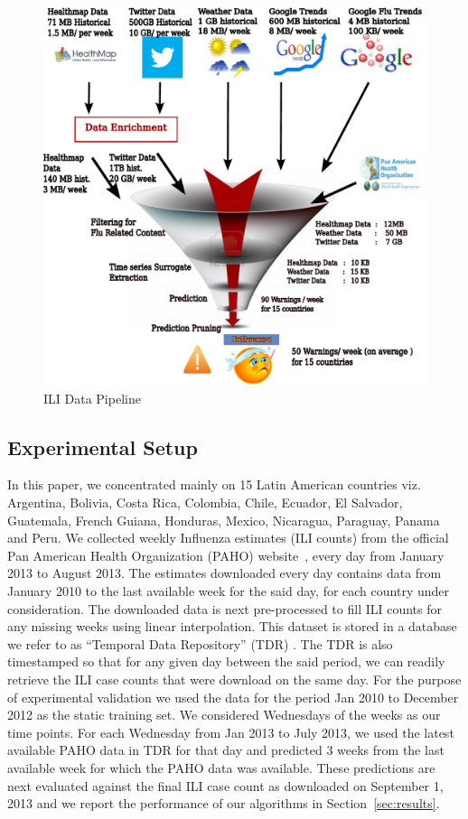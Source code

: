 \begin{figure}
  \centering
  \includegraphics[scale=0.3]{fig/ili_data_pipeline.pdf}
  \caption{\label{fig:ili_data_pipeline} ILI Data Pipeline}
\end{figure}

\subsection{Experimental Setup}
In this paper, we concentrated mainly on 15 Latin
American countries viz. Argentina, Bolivia, Costa Rica, Colombia,
Chile, Ecuador,  El Salvador, Guatemala, French Guiana, Honduras, Mexico, 
Nicaragua, Paraguay, Panama and Peru. We collected weekly Influenza
estimates (ILI counts) from the official Pan American Health
Organization (PAHO) website~\cite{PAHO:2013}, every day from January 2013 to
August 2013. The estimates downloaded every day contains data from
January 2010 to the last available week for the said day, for each
country under consideration. The downloaded data is next pre-processed to
fill ILI counts for any missing weeks using linear interpolation. This
dataset is stored in a database we refer to as ``Temporal Data Repository'' (TDR) .
The TDR is also timestamped so that for any given day between the said
period, we can readily retrieve the ILI case counts that were download
on the same day.
For the purpose of experimental validation we used the data for the period Jan 2010 to
December 2012 as the static training set. We considered Wednesdays of the weeks as our 
time points. 
For each Wednesday from Jan
2013 to July 2013, we used the latest available PAHO data in TDR for that day
and predicted 3 weeks from the last available week for which the PAHO
data was available. These predictions are next evaluated against the
final ILI case count as downloaded on September 1, 2013 and we report the
performance of our algorithms in Section~\ref{sec:results}. 

